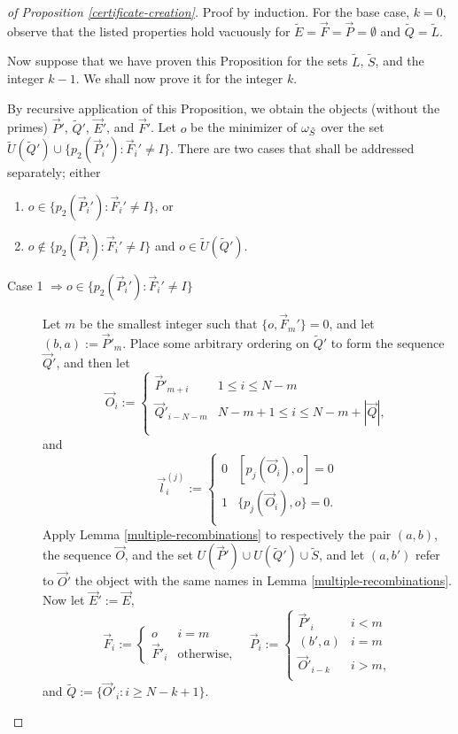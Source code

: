 \documentclass[twocolumn,showpacs,preprintnumbers,amsmath,amssymb,nofootinbib,pra,floatfix]{revtex4-1}
\newcommand{\lst}{\vec}
\newcommand{\set}{\tilde}
\begin{document}
\begin{proof}[of Proposition \ref{certificate-creation}]

Proof by induction.  For the base case, $k=0$, observe that the listed properties hold vacuously for $\set E=\lst F=\lst P=\emptyset$ and $\set Q=\set L$.

Now suppose that we have proven this Proposition for the sets $\set L$, $\set S$, and the integer $k-1$.  We shall now prove it for the integer $k$.

By recursive application of this Proposition, we obtain the objects (without the primes) $\lst P'$, $\set Q'$, $\lst E'$, and $\lst F'$.  Let $o$ be the minimizer of $\om_{\set S}$ over the set $\set U(\set Q') \cup \{p_2(\lst P_i'):\lst F_i' \ne I\}$.  There are two cases that shall be addressed separately; either

\begin{enumerate}
\item $o\in\{p_2(\lst P_i'):\lst F_i' \ne I\}$, or
\item $o\notin\{p_2(\lst P_i):\lst F_i' \ne I\}$ and $o\in\set U(\set Q')$.
\end{enumerate}

\begin{description}

\item[Case 1 $\Rightarrow o\in\{p_2(\lst P_i'):\lst F_i' \ne I\}$]
Let $m$ be the smallest integer such that $\{o,\lst F_m'\}=0$, and let $(b,a):=\lst P'_m$.  Place some arbitrary ordering on $\set Q'$ to form the sequence $\lst Q'$, and then let
$$\lst O_i :=
\begin{cases}
\lst P'_{m+i} & 1 \le i \le N-m \\
\lst Q'_{i-N-m} & N-m+1 \le i \le N-m+|\lst Q|, \\
\end{cases}
$$
and
$$\lst l^{(j)}_i :=
\begin{cases}
0 & [p_j(\lst O_i),o] = 0 \\
1 & \{p_j(\lst O_i),o\} = 0. \\
\end{cases}
$$
Apply Lemma \ref{multiple-recombinations} to respectively the pair $(a,b)$, the sequence $\lst O$, and the set $U(\lst P')\cup U(\set Q')\cup \set S$, and let $(a,b')$ refer to $\lst O'$ the object with the same names in Lemma \ref{multiple-recombinations}.  Now let $\lst E':= \lst E$,
$$\lst F_i := 
\begin{cases}
o & i = m \\
\lst F'_i & \text{otherwise},
\end{cases}
\quad
\lst P_i :=
\begin{cases}
\lst P'_i & i < m \\
(b',a) & i = m \\
\lst O'_{i-k} & i > m, \\
\end{cases}
$$
and $\set Q := \{\lst O'_i : i \ge N-k+1\}$.


\end{description}
\end{proof}
\end{document}
